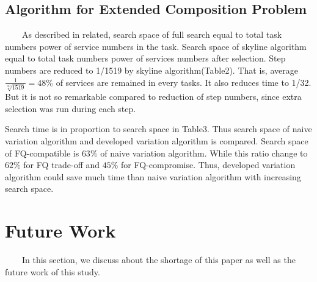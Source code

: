\documentclass[senior,final,11pt]{iscs-thesis}
\begin{document}
\subsection{Algorithm for Extended Composition Problem}
~~~~As described in related, search space of full search equal to total task numbers power of service numbers in the task. Search space of skyline algorithm equal to total task numbers power of services numbers after selection. Step numbers are reduced to 1/1519 by skyline algorithm(Table2). That is, average $\frac{1}{\sqrt[10]{1519}} = 48\%$ of services are remained in every tasks. It also reduces time to 1/32. But it is not so remarkable compared to reduction of step numbers, since extra selection was run during each step. 

Search time is in proportion to search space in Table3. Thus search space of naive variation algorithm and developed variation algorithm is compared. Search space of FQ-compatible is $63\%$ of naive variation algorithm. While this ratio change to $62\%$ for FQ trade-off and $45\%$ for FQ-compromise. Thus, developed variation algorithm could save much time than naive variation algorithm with increasing search space. 

\section{Future Work}
~~~~In this section, we discuss about the shortage of this paper as well as the future work of this study.
\end{document}
